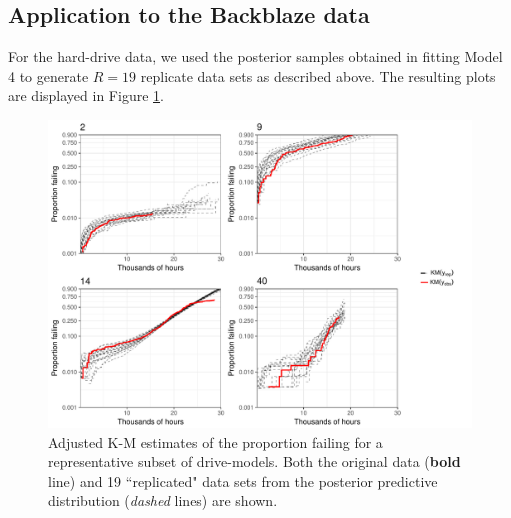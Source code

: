 \documentclass[12pt]{article}
\begin{document}
\subsection{Application to the Backblaze data}
For the hard-drive data, we used the posterior samples obtained in fitting Model 4 to generate $R=19$ replicate data sets as described above. The resulting plots are displayed in Figure \ref{fig:post-pred-KM}. 



\begin{figure}[H]
\includegraphics[width=\textwidth]{ppcheck-sample}
\caption{Adjusted K-M estimates of the proportion failing for a representative subset of drive-models. Both the original data (\textbf{bold} line) and 19 ``replicated" data sets from the posterior predictive distribution (\textit{dashed} lines) are shown.}
\label{fig:post-pred-KM}
\end{figure}
\end{document}
